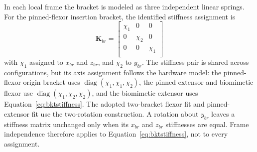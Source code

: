 \documentclass[utf8]{FrontiersinHarvard} %
\begin{document}
In each local frame the bracket is modeled as three independent linear springs. For the pinned-flexor insertion bracket, the identified stiffness assignment is
\begin{equation}
\mathbf{K}_{br} =
\begin{bmatrix}
\chi_{1} & 0   & 0 \\
0   & \chi_{2} & 0 \\
0   & 0   & \chi_{1} \\
\end{bmatrix}
\label{eq:bktstiffness}
\end{equation}
with $\chi_{1}$ assigned to $x_{br}$ and $z_{br}$, and $\chi_{2}$ to $y_{br}$. The stiffness pair is shared across configurations, but its axis assignment follows the hardware model: the pinned-flexor origin bracket uses $\operatorname{diag}(\chi_1,\chi_1,\chi_2)$, the pinned extensor and biomimetic flexor use $\operatorname{diag}(\chi_1,\chi_2,\chi_2)$, and the biomimetic extensor uses Equation~\eqref{eq:bktstiffness}. The adopted two-bracket flexor fit and pinned-extensor fit use the two-rotation construction. A rotation about $y_{br}$ leaves a stiffness matrix unchanged only when its $x_{br}$ and $z_{br}$ stiffnesses are equal. Frame independence therefore applies to Equation~\eqref{eq:bktstiffness}, not to every assignment.
\end{document}
